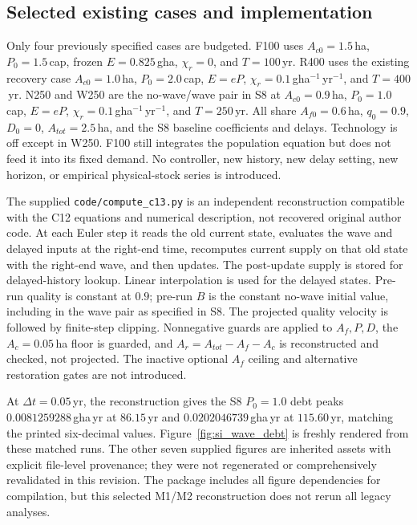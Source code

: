 \documentclass[11pt,a4paper]{article}
\begin{document}
\subsection{Selected existing cases and implementation}

Only four previously specified cases are budgeted. F100 uses $A_{c0}=1.5$\,ha, $P_0=1.5$\,cap, frozen $E=0.825$\,gha, $\chi_r=0$, and $T=100$\,yr. R400 uses the existing recovery case $A_{c0}=1.0$\,ha, $P_0=2.0$\,cap, $E=eP$, $\chi_r=0.1$\,gha$^{-1}$\,yr$^{-1}$, and $T=400$\,yr. N250 and W250 are the no-wave/wave pair in S8 at $A_{c0}=0.9$\,ha, $P_0=1.0$\,cap, $E=eP$, $\chi_r=0.1$\,gha$^{-1}$\,yr$^{-1}$, and $T=250$\,yr. All share $A_{f0}=0.6$\,ha, $q_0=0.9$, $D_0=0$, $A_{tot}=2.5$\,ha, and the S8 baseline coefficients and delays. Technology is off except in W250. F100 still integrates the population equation but does not feed it into its fixed demand. No controller, new history, new delay setting, new horizon, or empirical physical-stock series is introduced.

The supplied \texttt{code/compute\_c13.py} is an independent reconstruction compatible with the C12 equations and numerical description, not recovered original author code. At each Euler step it reads the old current state, evaluates the wave and delayed inputs at the right-end time, recomputes current supply on that old state with the right-end wave, and then updates. The post-update supply is stored for delayed-history lookup. Linear interpolation is used for the delayed states. Pre-run quality is constant at $0.9$; pre-run $B$ is the constant no-wave initial value, including in the wave pair as specified in S8. The projected quality velocity is followed by finite-step clipping. Nonnegative guards are applied to $A_f,P,D$, the $A_c=0.05$\,ha floor is guarded, and $A_r=A_{tot}-A_f-A_c$ is reconstructed and checked, not projected. The inactive optional $A_f$ ceiling and alternative restoration gates are not introduced.

At $\Delta t=0.05$\,yr, the reconstruction gives the S8 $P_0=1.0$ debt peaks $0.0081259288$\,gha\,yr at $86.15$\,yr and $0.0202046739$\,gha\,yr at $115.60$\,yr, matching the printed six-decimal values. Figure~\ref{fig:si_wave_debt} is freshly rendered from these matched runs. The other seven supplied figures are inherited assets with explicit file-level provenance; they were not regenerated or comprehensively revalidated in this revision. The package includes all figure dependencies for compilation, but this selected M1/M2 reconstruction does not rerun all legacy analyses.
\end{document}
